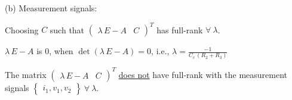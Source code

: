 (b) Measurement signals: 

Choosing $C$ such that $\begin{pmatrix}
    \lambda\,E - A & C
\end{pmatrix}^T$ has full-rank $\forall\ \lambda$. 

$\lambda\,E - A$ is 0, when $\det\left(\lambda\,E - A\right) = 0$, i.e., $\lambda = \frac{-1}{C_c\,\left(R_2 + R_3\right)}$ 

The matrix $\begin{pmatrix}
    \lambda\,E - A & C
\end{pmatrix}^T$ \underline{does not} have full-rank with the measurement signals $\begin{Bmatrix}
    i_1, v_1, v_2
\end{Bmatrix}\ \forall\ \lambda$.


